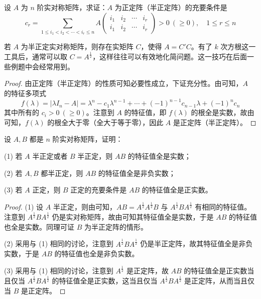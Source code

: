 \documentclass[../../main.tex]{subfiles}
\begin{document}
\begin{proposition}\label{proposition:例9.63}
设 \(A\) 为 \(n\) 阶实对称矩阵，求证：\(A\) 为正定阵（半正定阵）的充要条件是
\[
c_r = \sum_{1\leqslant  i_1 < i_2 < \cdots < i_r \leqslant  n}A\begin{pmatrix}
i_1 & i_2 & \cdots & i_r \\
i_1 & i_2 & \cdots & i_r
\end{pmatrix} > 0\ (\geqslant  0),\quad 1\leqslant  r \leqslant  n
\]
\end{proposition}
\begin{remark}
若 \(A\) 为半正定实对称矩阵，则存在实矩阵 \(C\)，使得 \(A = C'C\)。有了 \(k\) 次方根这一工具后，通常可以取 \(C = A^{\frac{1}{2}}\)，这样往往可以有效地化简问题。这一技巧在后面一些例题中会经常用到。 
\end{remark}
\begin{proof}
由正定阵（半正定阵）的性质可知必要性成立，下证充分性。由可知，\(A\) 的特征多项式
\[
f(\lambda) = |\lambda I_n - A| = \lambda^n - c_1\lambda^{n - 1} + \cdots + (-1)^{n - 1}c_{n - 1}\lambda + (-1)^nc_n
\]
其中所有的 \(c_i > 0\ (\geqslant  0)\)。注意到 \(A\) 的特征值，即 \(f(\lambda)\) 的根全是实数，故由可知，\(f(\lambda)\) 的根全大于零（全大于等于零），因此 \(A\) 是正定阵（半正定阵）。

\end{proof}

\begin{proposition}\label{proposition:例9.64}
设 \(A,B\) 都是 \(n\) 阶实对称矩阵，证明：

(1) 若 \(A\) 半正定或者 \(B\) 半正定，则 \(AB\) 的特征值全是实数；

(2) 若 \(A,B\) 都半正定，则 \(AB\) 的特征值全是非负实数；

(3) 若 \(A\) 正定，则 \(B\) 正定的充要条件是 \(AB\) 的特征值全是正实数。
\end{proposition}
\begin{proof}
(1) 设 \(A\) 半正定，则由可知，\(AB = A^{\frac{1}{2}}A^{\frac{1}{2}}B\) 与 \(A^{\frac{1}{2}}BA^{\frac{1}{2}}\) 有相同的特征值。注意到 \(A^{\frac{1}{2}}BA^{\frac{1}{2}}\) 仍是实对称矩阵，故由可知其特征值全是实数，于是 \(AB\) 的特征值也全是实数。同理可证 \(B\) 为半正定阵的情形。

(2) 采用与 (1) 相同的讨论，注意到 \(A^{\frac{1}{2}}BA^{\frac{1}{2}}\) 仍是半正定阵，故其特征值全是非负实数，于是 \(AB\) 的特征值也全是非负实数。

(3) 采用与 (1) 相同的讨论，注意到 \(A^{\frac{1}{2}}\) 是正定阵，故 \(AB\) 的特征值全是正实数当且仅当 \(A^{\frac{1}{2}}BA^{\frac{1}{2}}\) 的特征值全是正实数，这当且仅当 \(A^{\frac{1}{2}}BA^{\frac{1}{2}}\) 是正定阵，从而当且仅当 \(B\) 是正定阵。 

\end{proof}
\end{document}

